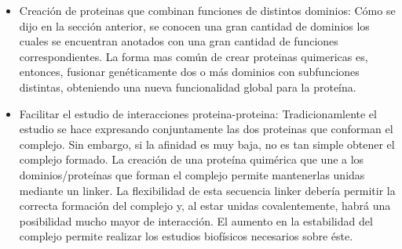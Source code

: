 \begin{itemize}
 \item Creación de proteinas que combinan funciones de distintos dominios:
Cómo se dijo en la sección anterior, se conocen una gran cantidad de dominios los cuales se encuentran anotados con una gran cantidad de funciones correspondientes.
La forma mas común de crear proteinas quimericas es, entonces, fusionar genéticamente dos o más dominios con subfunciones distintas, obteniendo una nueva funcionalidad global para la proteína.
\item Facilitar el estudio de interacciones proteina-proteina\cite{reddy2013linkers}: 
Tradicionamlente el estudio se hace expresando conjuntamente las dos proteinas que conforman el complejo.
Sin embargo, si la afinidad es muy baja, no es tan simple obtener el complejo formado.
La creación de una proteína quimérica que une a los dominios/proteínas que forman el complejo permite mantenerlas unidas mediante un linker.
La flexibilidad de esta secuencia linker debería permitir la correcta formación del complejo y, al estar unidas covalentemente, habrá una posibilidad mucho mayor de interacción.
El aumento en la estabilidad del complejo permite realizar los estudios biofísicos necesarios sobre éste.

\end{itemize}
